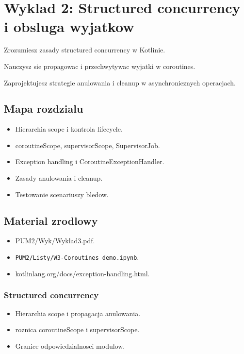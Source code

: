 \chapter{Wyklad 2: Structured concurrency i obsluga wyjatkow}

\begin{learningobjectives}
  \item Zrozumiesz zasady structured concurrency w Kotlinie.
  \item Nauczysz sie propagowac i przechwytywac wyjatki w coroutines.
  \item Zaprojektujesz strategie anulowania i cleanup w asynchronicznych operacjach.
\end{learningobjectives}

\section{Mapa rozdzialu}
\begin{itemize}
  \item Hierarchia scope i kontrola lifecycle.
  \item coroutineScope, supervisorScope, SupervisorJob.
  \item Exception handling i CoroutineExceptionHandler.
  \item Zasady anulowania i cleanup.
  \item Testowanie scenariuszy bledow.
\end{itemize}

\section{Material zrodlowy}
\begin{itemize}
  \item PUM2/Wyk/Wyklad3.pdf.
  \item \texttt{PUM2/Listy/W3-Coroutines\_demo.ipynb}.
  \item kotlinlang.org/docs/exception-handling.html.
\end{itemize}

\subsection{Structured concurrency}
\begin{itemize}
  \item Hierarchia scope i propagacja anulowania.
  \item roznica coroutineScope i supervisorScope.
  \item Granice odpowiedzialnosci modulow.
\end{itemize}

